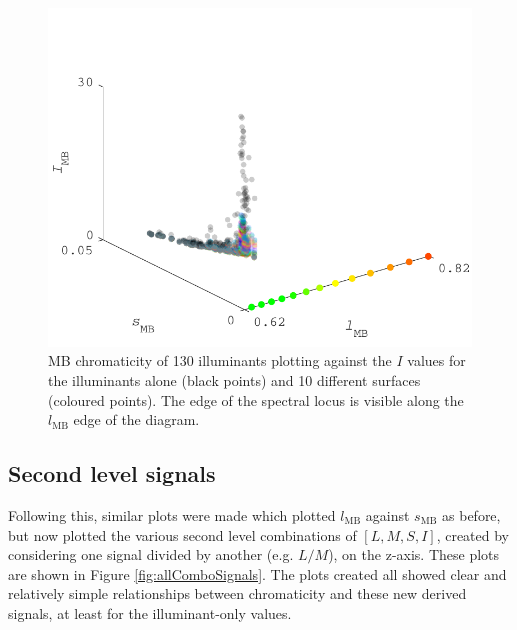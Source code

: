 \begin{figure}[htbp]
    \includegraphics[max width=\textwidth]{figs/comp/predictingChromaticity/CvsI.pdf}
    \caption{\gls{MB} chromaticity of 130 illuminants plotting against the $I$ values for the illuminants alone (black points) and 10 different surfaces (coloured points). The edge of the spectral locus is visible along the $l_{\text{MB}}$ edge of the diagram.}
    \label{fig:level1}
\end{figure} 

\subsection{Second level signals}
Following this, similar plots were made which plotted $l_{\text{MB}}$ against $s_{\text{MB}}$ as before, but now plotted the various second level combinations of $[L,M,S,I]$, created by considering one signal divided by another (e.g. $L/M$), on the z-axis. These plots are shown in Figure \ref{fig:allComboSignals}. The plots created all showed clear and relatively simple relationships between chromaticity and these new derived signals, at least for the illuminant-only values. 

\begin{fullpagefigure}
\caption{Relationship between chromaticity and second level signals. Plotted on the x-axis here is $l_{\text{MB}}$, with second level signals on the apparent y-axis. During analysis these plots were three dimensional, with the apparent y-axis being a z-axis and the x-axis joined by a y-axis of $s_{\text{MB}}$. As before, black points indicate direct illuminant values, with coloured values corresponding to surface reflectances (though the colours do not relate the surfaces other than to distinguish one from another). It can be seen that on a per object basis (incl. no object) there is good correlation between chromaticity and all of the above signals. A similar relationship holds for the $s_{\text{MB}}$ perspective.}
\label{fig:allComboSignals}
\end{fullpagefigure}

